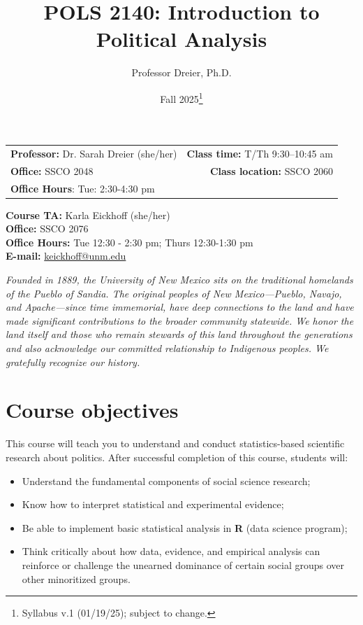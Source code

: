 \documentclass[11pt]{article}
\title{POLS 2140: Introduction to Political Analysis\vspace{-20pt}}
\author{Professor Dreier, Ph.D.}
\date{\vspace{-8pt}Fall 2025\footnote{Syllabus v.1 (01/19/25); subject to change.}\vspace{-10pt}}
\begin{document}
\maketitle

\begin{tabular*}{.93\textwidth}{@{\extracolsep{\fill}}lr}

\textbf{Professor:} Dr. Sarah Dreier (she/her) & \textbf{Class time: }T/Th 9:30--10:45 am\\
\textbf{Office:} SSCO 2048 & \textbf{Class location: } SSCO 2060\\
\textbf{Office Hours}: Tue: 2:30-4:30 pm &\\
\end{tabular*}
\vspace{15pt}

\textbf{Course TA:} Karla Eickhoff
(she/her)\\
\indent \textbf{Office:} SSCO 2076\\
\indent \textbf{Office Hours:} Tue 12:30 - 2:30 pm; Thurs 12:30-1:30 pm \\
\indent \textbf{E-mail:} \href{keickhoff@unm.edu}{keickhoff@unm.edu}
\vspace{15pt}

\normalsize

\noindent \textit{Founded in 1889, the University of New Mexico sits on the traditional homelands of the Pueblo of Sandia. The original peoples of New Mexico---Pueblo, Navajo, and Apache---since time
immemorial, have deep connections to the land and have made significant contributions to the broader community statewide. We honor the land itself and those who remain stewards of this land
throughout the generations and also acknowledge our committed relationship to Indigenous peoples. We gratefully recognize our history.
}\vspace{-10pt}

\section*{Course objectives}

This course will teach you to understand and conduct statistics-based scientific research about politics. After successful completion of this course, students will:

\begin{itemize}
    \item Understand the fundamental components of social science research;
    \item Know how to interpret statistical and experimental evidence;
    \item Be able to implement basic statistical analysis in \textbf{\textsf{R}} (data science program);
    \item Think critically about how data, evidence, and empirical analysis can reinforce or challenge the unearned dominance of certain social groups over other minoritized groups.

\end{itemize}
\end{document}
